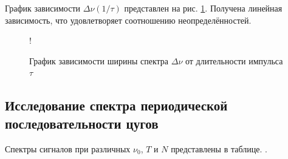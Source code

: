 \documentclass[a4paper,12pt]{article} %
\begin{document}
График зависимости $\Delta{\nu}(1/\tau)$ представлен на рис. \ref{plotI}. Получена линейная зависимость, что удовлетворяет соотношению неопределённостей.

\begin{figure}[h!]
\centering
{} {!} {
}
\caption{График зависимости ширины спектра $\Delta{\nu}$ от длительности импульса $\tau$}
\label{plotI}
\end{figure}

\subsection{Исследование спектра периодической последовательности цугов}

Спектры сигналов при различных $\nu_0$, $T$ и $N$ представлены в таблице. .
\end{document}
